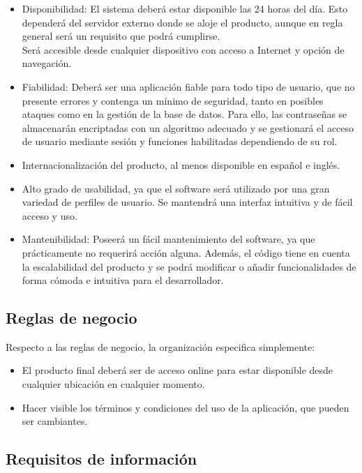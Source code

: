 \begin{itemize}
\item Disponibilidad: El sistema deberá estar disponible las 24 horas del día. Esto dependerá del servidor externo donde se aloje el producto, aunque en regla general será un requisito que podrá cumplirse. \\
Será accesible desde cualquier dispositivo con acceso a Internet y opción de navegación.
\item Fiabilidad: Deberá ser una aplicación fiable para todo tipo de usuario, que no presente errores y contenga un mínimo de seguridad, tanto en posibles ataques como en la gestión de la base de datos. Para ello, las contraseñas se almacenarán encriptadas con un algoritmo adecuado y se gestionará el acceso de usuario mediante sesión y funciones habilitadas dependiendo de su rol. 
\item Internacionalización del producto, al menos disponible en español e inglés.
\item Alto grado de usabilidad, ya que el software será utilizado por una gran variedad de perfiles de usuario. Se mantendrá una interfaz intuitiva y de fácil acceso y uso.
\item Mantenibilidad:  Poseerá un fácil mantenimiento del software, ya que prácticamente no requerirá acción alguna. Además, el código tiene en cuenta la escalabilidad del producto y se podrá modificar o añadir funcionalidades de forma cómoda e intuitiva para el desarrollador.  
\end{itemize}


\subsection{Reglas de negocio}

Respecto a las reglas de negocio, la organización especifica simplemente: 

\begin{itemize}
\item El producto final deberá ser de acceso online para estar disponible desde cualquier ubicación en cualquier momento.
\item Hacer visible los términos y condiciones del uso de la aplicación, que pueden ser cambiantes.
\end{itemize}


\subsection{Requisitos de información}

